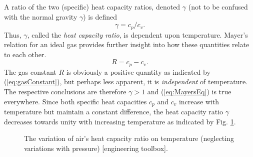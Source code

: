 \documentclass[11pt,dvipsnames]{thesis}
\begin{document}
A ratio of the two (specific) heat capacity ratios, denoted $\gamma$ (not to be confused with the normal gravity $\gamma$) is defined
\begin{equation}
\gamma = c_p / c_v. \label{eq:SpecificHeatRatio}
\end{equation}
Thus, $\gamma$, called the \textit{heat capacity ratio}, is dependent upon temperature. Mayer's relation for an ideal gas provides further insight into how these quantities relate to each other.
\begin{equation}
R = c_p - c_v. \label{eq:MayersEq}
\end{equation}
The gas constant $R$ is obviously a positive quantity as indicated by (\ref{eq:gasConstant}), but perhaps less apparent, it is \textit{independent} of temperature. The respective conclusions are therefore $\gamma > 1$ and (\ref{eq:MayersEq}) is true everywhere.
%
Since both specific heat capacities $c_p$ and $c_v$ increase with temperature but maintain a constant difference, the heat capacity ratio $\gamma$ decreases towards unity with increasing temperature as indicated by Fig. \ref{fig:AirHeatCapacityRatioGraph}.
\begin{figure}[H]%
\centering
{}
\caption{The variation of air's heat capacity ratio on temperature (neglecting variations with pressure) [engineering toolbox].}
\label{fig:AirHeatCapacityRatioGraph}
\end{figure}
\end{document}
